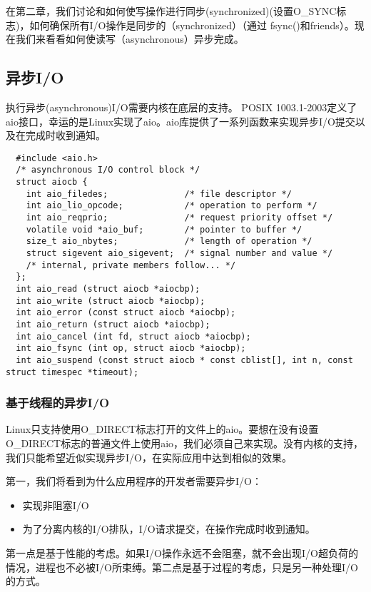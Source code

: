 在第二章，我们讨论和如何使写操作进行同步(synchronized)(设置O\_SYNC标志)，如何确保所有I/O操作是同步的（synchronized）（通过 fsync()和friends）。现在我们来看看如何使读写（asynchronous）异步完成。

\subsection{异步I/O}

执行异步(asynchronous)I/O需要内核在底层的支持。 POSIX 1003.1-2003定义了aio接口，幸运的是Linux实现了aio。aio库提供了一系列函数来实现异步I/O提交以及在完成时收到通知。

\begin{lstlisting}
  #include <aio.h>
  /* asynchronous I/O control block */
  struct aiocb {
    int aio_filedes;               /* file descriptor */
    int aio_lio_opcode;            /* operation to perform */
    int aio_reqprio;               /* request priority offset */
    volatile void *aio_buf;        /* pointer to buffer */
    size_t aio_nbytes;             /* length of operation */
    struct sigevent aio_sigevent;  /* signal number and value */
    /* internal, private members follow... */
  };
  int aio_read (struct aiocb *aiocbp);
  int aio_write (struct aiocb *aiocbp);
  int aio_error (const struct aiocb *aiocbp);
  int aio_return (struct aiocb *aiocbp);
  int aio_cancel (int fd, struct aiocb *aiocbp);
  int aio_fsync (int op, struct aiocb *aiocbp);
  int aio_suspend (const struct aiocb * const cblist[], int n, const struct timespec *timeout);   
\end{lstlisting}

\subsubsection{基于线程的异步I/O}

Linux只支持使用O\_DIRECT标志打开的文件上的aio。要想在没有设置O\_DIRECT标志的普通文件上使用aio，我们必须自己来实现。没有内核的支持，我们只能希望近似实现异步I/O，在实际应用中达到相似的效果。

第一，我们将看到为什么应用程序的开发者需要异步I/O：

\begin{itemize}
\item 实现非阻塞I/O
\item 为了分离内核的I/O排队，I/O请求提交，在操作完成时收到通知。
\end{itemize}

第一点是基于性能的考虑。如果I/O操作永远不会阻塞，就不会出现I/O超负荷的情况，进程也不必被I/O所束缚。第二点是基于过程的考虑，只是另一种处理I/O的方式。


